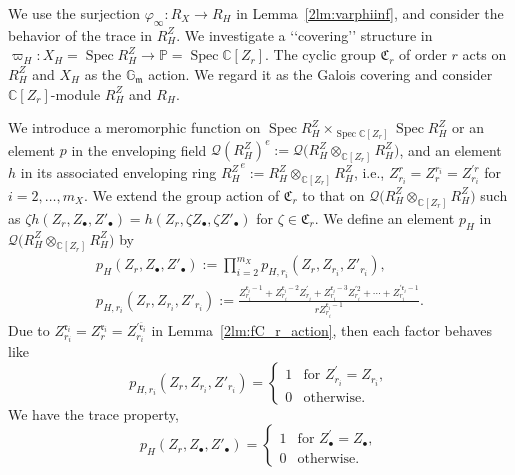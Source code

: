 \documentclass[10pt,a4paper]{amsart}
\def\CC{{\mathbb C}}
\def\GG{{\mathbb G}}
\def\PP{{\mathbb P}}
\def\cQ{{\mathcal Q}}
\def\fC{{\mathfrak C}}
\def\fm{{\mathfrak m}}
\def\fr{{\mathfrak r}}
\def\Bfr{{\overline{\mathfrak r}}}
\def\Spec{\operatorname{Spec}}
\numberwithin{equation}{section}
\begin{document}
We use the surjection $\varphi_\infty\colon R_X \to R_H$ in Lemma~\ref{2lm:varphiinf}, and consider the behavior of the trace in $R_H^Z$.
We investigate a {\lq\lq}covering{\rq\rq} structure in $\varpi_H\colon X_H=\Spec R_H^Z \to \PP=\Spec \CC[Z_r]$.
The cyclic group $\fC_r$ of order $r$ acts on $R_H^Z$ and $X_H$ as the $\GG_\fm$ action.
We regard it as the Galois covering and consider $\CC[Z_r]$-module $R_H^Z$ and $R_H$.

We introduce a meromorphic function on $\Spec R_H^Z \times_{\Spec \CC[Z_r]} \Spec R_H^Z$ or an element $p$ in the enveloping field $\cQ(R_H^Z)^e:=\cQ\big(R_H^Z \otimes_{\CC[Z_r]} R_H^Z\big)$, and an element $h$ in its associated enveloping ring ${R_H^{Z}}^e:=R_H^Z \otimes_{\CC[Z_r]} R_H^Z$, i.e., $Z_{r_i}^{r}=Z_r^{r_i}=Z_{r_i}^{\prime r}$ for $i=2, \dots, m_X$.
We extend the group action of $\fC_r$ to that on $\cQ\big(R_H^Z \otimes_{\CC[Z_r]} R_H^Z\big)$ such as $\zeta h(Z_r, Z_\bullet, Z'_\bullet) = h(Z_r, \zeta Z_\bullet, \zeta Z'_\bullet)$ for $\zeta \in \fC_r$.
We define an element $p_{H}$ in $\cQ\big(R_H^Z \otimes_{\CC[Z_r]} R_H^Z\big)$ by
\begin{gather}
p_{H}(Z_r, Z_\bullet, Z'_\bullet) :=\prod_{i=2}^{m_X}p_{H, r_i}(Z_r, Z_{r_i}, Z'_{r_i}),\nonumber\\
p_{H, r_i}(Z_r, Z_{r_i}, Z'_{r_i}) :=\frac{Z^{\fr_i-1}_{r_i}+Z^{\fr_i-2}_{r_i}Z^{\prime}_{r_i}
+Z^{\fr_i-3}_{r_i}Z^{\prime 2}_{r_i}+\cdots+Z^{\prime \fr_i-1}_{r_i}}{r Z_{r_i}^{\fr_i-1}}.\label{2eq:p_varphiH}
\end{gather}
Due to $Z_{r_i}^{\fr_i} = Z_r^{\fr_i}=Z_{r_i}^{\prime \Bfr_i}$ in Lemma~\ref{2lm:fC_r_action}, then each factor behaves like
\[
p_{H, r_i}(Z_r, Z_{r_i}, Z'_{r_i})
= \begin{cases}
1 & \text{for } Z^{\prime}_{r_i}=Z_{r_i},\\
0 & \text{otherwise}.\end{cases}
\]
We have the trace property,
\begin{equation}
p_{H}(Z_r, Z_\bullet, Z'_\bullet)
= \begin{cases}
1 & \text{for } Z^{\prime}_{\bullet}=Z_{\bullet},\\
0 & \text{otherwise}.\end{cases}
\label{2eq:6aa}
\end{equation}
\end{document}
